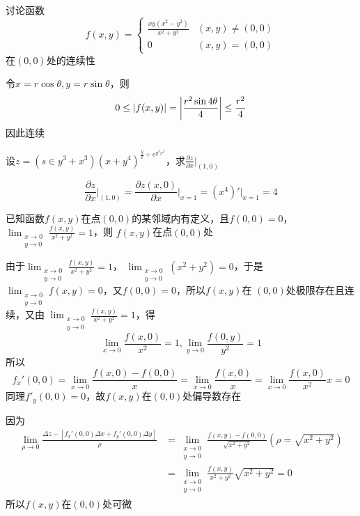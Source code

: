 \documentclass{article}
\begin{document}
\begin{examplle}[]
讨论函数
\begin{equation*}
f(x,y)=
\begin{cases}
\frac{xy(x^2-y^2)}{x^2+y^2}&(x,y)\neq(0,0)\\
0&(x,y)=(0,0)
\end{cases}
\end{equation*}在\((0,0)\)处的连续性

令\(x=r\cos\theta,y=r\sin\theta\)，则
\begin{equation*}
0\le\abs{f(x,y)}=\abs{\frac{r^2\sin 4\theta}{4}}\le\frac{r^2}{4}
\end{equation*}
因此连续
\end{examplle}

\begin{examplle}[]
设\(z=(s\in y^3+x^3)(x+y^4)^{\frac{y}{x}+e^{y^3x^2}}\)，求\(\frac{\partial z}{\partial
   x}\Big\rvert_{(1,0)}\)

\begin{equation*}
\frac{\partial z}{\partial x}\Big\rvert_{(1,0)}=\frac{\partial z(x,0)}{\partial x}\Big\rvert_{x=1}=(x^4)'
\Big\rvert_{x=1}=4
\end{equation*}
\end{examplle}

\begin{examplle}[]
已知函数\(f(x,y)\)在点\((0,0)\)的某邻域内有定义，且\(f(0,0)=0\)，
\(\displaystyle\lim_{\substack{x\to0\\y\to0}}\frac{f(x,y)}{x^2+y^2}=1\)，则
\(f(x,y)\)在点\((0,0)\)处

由于\(\displaystyle\lim_{\substack{x\to0\\y\to0}}\frac{f(x,y)}{x^2+y^2}=1\)，
\(\lim_{\substack{x\to0\\y\to0}}(x^2+y^2)=0\)，于是
\(\lim_{\substack{x\to0\\y\to0}}f(x,y)=0\)，又\(f(0,0)=0\)，所以\(f(x,y)\)在
\((0,0)\)处极限存在且连续，又由
\(\lim_{\substack{x\to0\\y\to0}}\frac{f(x,y)}{x^2+y^2}=1\)，得
\begin{equation*}
\lim_{x\to0}\frac{f(x,0)}{x^2}=1,
\lim_{y\to0}\frac{f(0,y)}{y^2}=1
\end{equation*}
所以
\begin{equation*}
f_x'(0,0)=\lim_{x\to0}\frac{f(x,0)-f(0,0)}{x}=
\lim_{x\to0}\frac{f(x,0)}{x}=\lim_{x\to0}\frac{f(x,0)}{x^2}x=0
\end{equation*}
同理\(f'_y(0,0)=0\)，故\(f(x,y)\)在\((0,0)\)处偏导数存在

因为
\begin{align*}
\lim_{\rho\to0}\frac{\Delta z-[f_x'(0,0)\Delta x+f_y'(0,0)\Delta y]}{\rho}&=
\lim_{\substack{x\to0\\y\to0}}\frac{f(x,y)-f(0,0)}{\sqrt{x^2+y^2}}(\rho=\sqrt{x^2+y^2})\\
&=\lim_{\substack{x\to0\\y\to0}}\frac{f(x,y)}{x^2+y^2}\sqrt{x^2+y^2}=0
\end{align*}
所以\(f(x,y)\)在\((0,0)\)处可微
\end{examplle}
\end{document}
